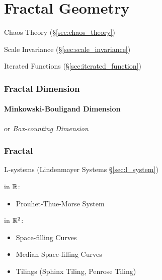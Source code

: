 \part{Fractal Geometry}\label{sec:fractal_geometry}

Chaos Theory (\S\ref{sec:chaos_theory})

Scale Invariance (\S\ref{sec:scale_invariance})

Iterated Functions (\S\ref{sec:iterated_function})



\section{Fractal Dimension}\label{sec:fractal_dimension}

\subsection{Minkowski-Bouligand Dimension}
\label{sec:minkowski_bouligand}

or \emph{Box-counting Dimension}



\section{Fractal}\label{sec:fractal}

\asterism

L-systems (Lindenmayer Systems \S\ref{sec:l_system})


in $\mathbb{R}$:
\begin{itemize}
  \item Prouhet-Thue-Morse System
\end{itemize}

in $\mathbb{R}^2$:
\begin{itemize}
  \item Space-filling Curves
  \item Median Space-filling Curves
  \item Tilings (Sphinx Tiling, Penrose Tiling)
\end{itemize}
